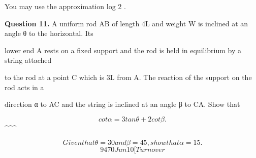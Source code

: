 \documentclass[12pt]{article}
\begin{document}
\begin{flushleft}
You may use the approximation log 2 .\par
\bigskip\textbf{Question 11.} A uniform rod AB of length 4L and weight W is inclined at an angle θ to the horizontal. Its\par
lower end A rests on a fixed support and the rod is held in equilibrium by a string attached\par
to the rod at a point C which is 3L from A. The reaction of the support on the rod acts in a\par
direction α to AC and the string is inclined at an angle β to CA. Show that\par
\[cot α = 3 tan θ + 2 cot β .\]
\textasciicircum{}\circ \textasciicircum{}\circ \textasciicircum{}\circ\par
\[Given that θ = 30 and β = 45 , show that α = 15 .\]
\[9470 Jun10 [Turn over\]
\end{flushleft}
\end{document}
